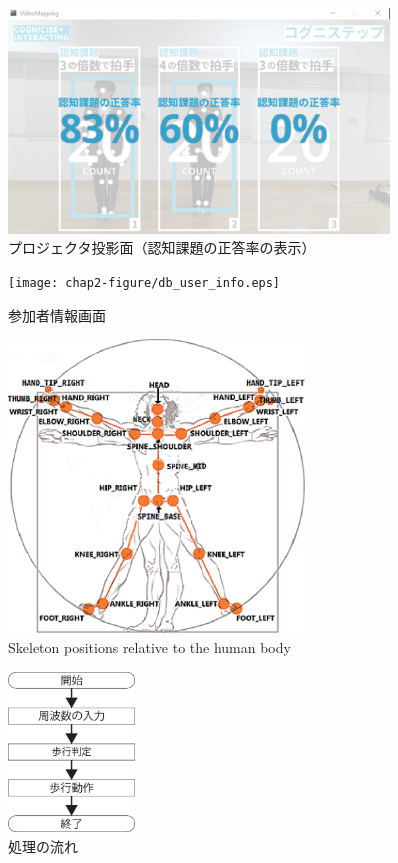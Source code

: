 \begin{figure}[tbp]
	\centering
			\includegraphics[width=0.9\textwidth]{chap2-figure/vm_answer_rate.eps}
	\caption{プロジェクタ投影面（認知課題の正答率の表示）}
	\label{fig:vm_answer_rate}
\end{figure}

\begin{figure}[tbp]
	\centering
			\texttt{[image: chap2-figure/db\_user\_info.eps]}
	\caption{参加者情報画面}
	\label{fig:db_user_info}
\end{figure}

\begin{figure}[tbp]
	\centering
			\includegraphics[width=0.7\textwidth]{chap2-figure/skelton_position.eps}
	\caption{Skeleton positions relative to the human body}
	\label{fig:skelton_position}
\end{figure}

\begin{figure}[tbp]
	\centering
			\includegraphics[width=0.3\textwidth]{chap2-figure/katagiri2.eps}
	\caption{処理の流れ}
	\label{fig:片桐2}
\end{figure}

